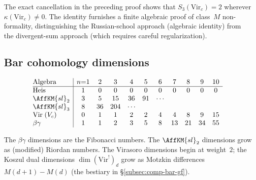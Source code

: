 \begin{remark}
\label{rem:s3-vir-compute}
The exact cancellation in the preceding proof shows that
$S_3(\mathrm{Vir}_c)=2$ wherever $\kappa(\mathrm{Vir}_c)\ne0$.
The identity furnishes a finite
algebraic proof of class~$M$ non-formality, distinguishing the
Russian-school approach (algebraic identity) from the
divergent-sum approach (which requires careful
regularization).
\end{remark}


\subsection{Bar cohomology dimensions}
\label{subsec:comp-bar-table}

\begin{table}[htbp]
\centering
\caption{Bar cohomology $\dim H^n(\barBch(\cA))$ at conformal
weight~$n$.}
\label{tab:comp-bar-dims}
\small
\[
\begin{array}{@{}l|cccccccccccc@{}}
 \text{Algebra}
 & n{=}1 & 2 & 3 & 4 & 5 & 6 & 7 & 8 & 9 & 10 \\
\hline
 \text{Heis}
 & 1 & 0 & 0 & 0 & 0 & 0 & 0 & 0 & 0 & 0 \\
 \AffKM{sl}_2
 & 3 & 5 & 15 & 36 & 91 & \cdots \\
 \AffKM{sl}_3
 & 8 & 36 & 204 & \cdots \\
 \text{Vir} \; (V_c)
 & 0 & 1 & 1 & 2 & 2 & 4 & 4 & 8 & 9 & 15 \\
 \beta\gamma
 & 1 & 1 & 2 & 3 & 5 & 8 & 13 & 21 & 34 & 55
\end{array}
\]
\end{table}

\begin{remark}
\label{rem:comp-bar-table-features}
The $\beta\gamma$ dimensions are the Fibonacci numbers.
The $\AffKM{sl}_2$ dimensions grow as (modified) Riordan
numbers. The Virasoro dimensions begin at weight~$2$; the
Koszul dual dimensions $\dim(\mathrm{Vir}^!)_d$ grow as
Motzkin differences $M(d{+}1) - M(d)$
(the bestiary in \S\ref{subsec:comp-bar-gf}).
\end{remark}


